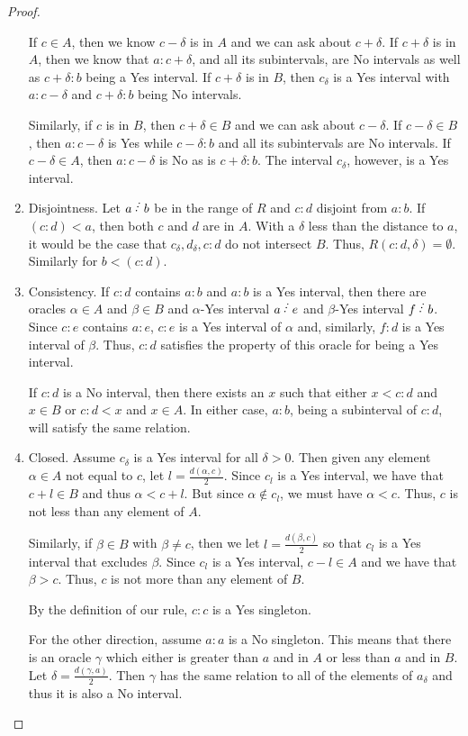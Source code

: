 \documentclass[12pt]{article}
\begin{document}
\begin{proof}
\begin{enumerate}
        If $c \in A$, then we know $c-\delta$ is in $A$ and we can ask about $c+\delta$. If $c+\delta$ is in $A$, then we know that $a:c+\delta$, and all its subintervals, are No intervals as well as $c+\delta:b$ being a Yes interval. If $c+\delta$ is in $B$, then $c_\delta$ is a Yes interval with $a:c-\delta$ and $c+\delta:b$ being No intervals. 

        Similarly, if $c$ is in $B$, then $c+\delta \in B$ and we can ask about $c-\delta$. If $c-\delta \in B$, then $a:c-\delta$ is Yes while $c-\delta:b$ and all its subintervals are No intervals. If $c-\delta \in A$, then $a:c-\delta$ is No as is $c+\delta:b$. The interval $c_\delta$, however, is a Yes interval. 

        \item Disjointness. Let $a \lte b$ be in the range of $R$ and $c : d$ disjoint from $a:b$. If $(c:d) < a$, then both $c$ and $d$ are in $A$. With a $\delta$ less than the distance to $a$, it would be the case that $c_\delta, d_\delta, c:d$ do not intersect $B$. Thus, $R(c:d, \delta) = \emptyset$. Similarly for $b < (c:d)$. 
         
        \item Consistency. If $c:d$ contains $a:b$ and $a:b$ is a Yes interval, then there are oracles $\alpha \in A$ and $\beta \in B$ and $\alpha$-Yes interval $a \lte e$ and $\beta$-Yes interval $f \lte b$. Since $c:e$ contains $a:e$, $c:e$ is a Yes interval of $\alpha$ and, similarly, $f:d$ is a Yes interval of $\beta$. Thus, $c:d$ satisfies the property of this oracle for being a Yes interval. 

        If $c:d$ is a No interval, then there exists an $x$ such that either $x < c:d$ and $x \in B$ or $c:d < x$ and $x\in A$. In either case, $a:b$, being a subinterval of $c:d$, will satisfy the same relation. 
        \item Closed. Assume $c_\delta$ is a Yes interval for all $\delta > 0$. Then given any element $\alpha \in A$ not equal to $c$, let $l = \frac{d(\alpha, c)}{2}$. Since $c_l$ is a Yes interval, we have that $c+l \in B$ and thus $\alpha < c+l$. But since $\alpha \notin c_l$, we must have $\alpha < c$. Thus, $c$ is not less than any element of $A$. 
        
        Similarly, if $\beta \in B$ with $\beta \neq c$, then we let $l = \frac{d(\beta,c)}{2}$ so that $c_l$ is a Yes interval that excludes $\beta$. Since $c_l$ is a Yes interval, $c-l \in A$ and we have that $\beta > c$. Thus, $c$ is not more than any element of $B$.

        By the definition of our rule, $c:c$ is a Yes singleton. 

        For the other direction, assume $a:a$ is a No singleton. This means that there is an oracle $\gamma$  which either is greater than $a$ and in $A$ or less than $a$ and in $B$. Let $\delta = \frac{d(\gamma, a)}{2}$. Then $\gamma$ has the same relation to all of the elements of $a_\delta$ and thus it is also a No interval.  
    \end{enumerate}
    
\end{proof}
\end{document}
